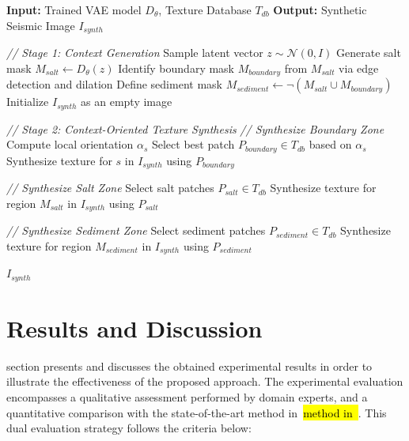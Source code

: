 \documentclass{ieeeaccess}
\makeatletter
\DeclareRobustCommand{\DIFaddbegin}{\DIFOaddbegin \let\includegraphics\DIFaddincludegraphics} %
\DeclareRobustCommand{\DIFaddend}{\DIFOaddend \let\includegraphics\DIFOincludegraphics} %
\DeclareRobustCommand{\DIFdelbegin}{\DIFOdelbegin \let\includegraphics\DIFdelincludegraphics} %
\DeclareRobustCommand{\DIFdelend}{\DIFOaddend \let\includegraphics\DIFOincludegraphics} %
\let\sout@orig\sout %
\renewcommand{\sout}[1]{\ifmmode\text{\sout@orig{\ensuremath{#1}}}\else\sout@orig{#1}\fi} %
\providecommand{\DIFadd}[1]{{\protect\color{blue}#1}}
\providecommand{\DIFdel}[1]{{\protect\color{red}\sout{#1}}}
\renewcommand{\DIFadd}[1]{\ifmmode#1\else\begingroup\let\protect\relax\hl{#1}\endgroup\fi}
\renewcommand{\DIFdel}[1]{}
\providecommand{\DIFaddbegin}{}
\providecommand{\DIFaddend}{}
\providecommand{\DIFdelbegin}{}
\providecommand{\DIFdelend}{}
\renewcommand{\DIFaddbegin}{}
\renewcommand{\DIFaddend}{}
\renewcommand{\DIFdelbegin}{}
\renewcommand{\DIFdelend}{}
\makeatother
\begin{document}
\begin{algorithm}[htbp]
\caption{Context-Oriented Seismic Image Synthesis}
\label{alg:synthesis}
\begin{algorithmic}[1]
\State \textbf{Input:} Trained VAE model $D_\theta$, Texture Database $T_{db}$
\State \textbf{Output:} Synthetic Seismic Image $I_{synth}$

\vspace{0.2cm}
\Statex \textit{// Stage 1: Context Generation}
\State Sample latent vector $z \sim \mathcal{N}(0, I)$
\State Generate salt mask $M_{salt} \leftarrow D_\theta(z)$
\State Identify boundary mask $M_{boundary}$ from $M_{salt}$ via edge detection and dilation
\State Define sediment mask $M_{sediment} \leftarrow \neg(M_{salt} \cup M_{boundary})$
\State Initialize $I_{synth}$ as an empty image

\vspace{0.2cm}
\Statex \textit{// Stage 2: Context-Oriented Texture Synthesis}
\State \textit{// Synthesize Boundary Zone}
    \State Compute local orientation $\alpha_s$
    \State Select best patch $P_{boundary} \in T_{db}$ based on $\alpha_s$
    \State Synthesize texture for $s$ in $I_{synth}$ using $P_{boundary}$
\EndFor

\State \textit{// Synthesize Salt Zone}
\State Select salt patches $P_{salt} \in T_{db}$
\State Synthesize texture for region $M_{salt}$ in $I_{synth}$ using $P_{salt}$

\State \textit{// Synthesize Sediment Zone}
\State Select sediment patches $P_{sediment} \in T_{db}$
\State Synthesize texture for region $M_{sediment}$ in $I_{synth}$ using $P_{sediment}$

\vspace{0.2cm}
\State \Return $I_{synth}$
\end{algorithmic}
\end{algorithm}

\section{Results and Discussion}
\label{sec:results}

 section presents and discusses the obtained experimental results in order to illustrate the effectiveness of the proposed approach. The experimental evaluation encompasses a qualitative assessment performed by domain experts, and a quantitative comparison with the \DIFdelbegin \DIFdel{available }\DIFdelend state-of-the-art \DIFaddbegin \DIFadd{method in~\cite{Ferreira2020}}\DIFaddend. This dual evaluation strategy follows the criteria below:
\end{document}
